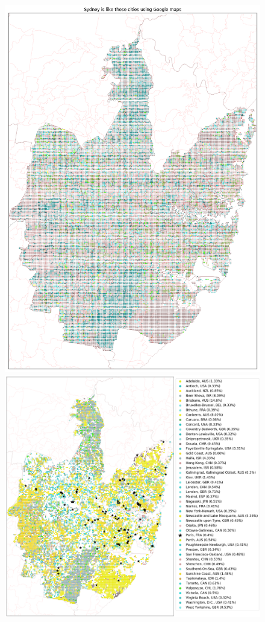\documentclass[final,3p,times,authoryear]{elsarticle}
\begin{document}

\begin{figure}[!htbp]
\centering    
\includegraphics[scale=0.25]{Images/SydneyOverall_maps.png} 
\includegraphics[scale=0.25]{Images/SydneyOverallAbrev_maps.png}  

\end{figure}
\end{document}
